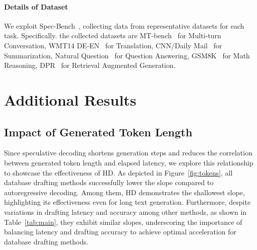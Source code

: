 

\paragraph{Details of Dataset}

We exploit Spec-Bench~\cite{Spec_Survey}, collecting data from representative datasets for each task.
Specifically. the collected datasets are MT-bench~\cite{vicuna} for Multi-turn Conversation, WMT14 DE-EN~\cite{translation} for Translation, CNN/Daily Mail~\cite{summarization} for Summarization, Natural Question~\cite{QA} for Question Answering, GSM8K~\cite{math} for Math Reasoning, DPR~\cite{RAG} for Retrieval Augmented Generation.

\section{Additional Results}\label{app:additional_result}

\subsection{Impact of Generated Token Length} 

Since speculative decoding shortens generation steps and reduces the correlation between generated token length and elapsed latency, we explore this relationship to showcase the effectiveness of HD.
As depicted in Figure~\ref{fig:tokens}, all database drafting methods successfully lower the slope compared to autoregressive decoding. 
Among them, HD demonstrates the shallowest slope, highlighting its effectiveness even for long text generation. 
Furthermore, despite variations in drafting latency and accuracy among other methods, as shown in Table~\ref{tab:main}, they exhibit similar slopes, underscoring the importance of balancing latency and drafting accuracy to achieve optimal acceleration for database drafting methods.


